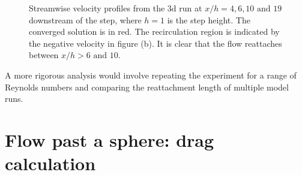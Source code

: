 \begin{figure}
\centering
{}
\caption{Streamwise velocity profiles from the 3d run at $x/h=4, 6, 10 \text{ and } 19$
downstream of the step, where $h=1$ is the step height. The converged solution is in red.
The recirculation region is indicated by the negative velocity in figure (b).
It is clear that the flow reattaches between $x/h>6 \text{ and } 10$.}
\label{Fig:UProfiles3d}
\end{figure}






A more rigorous analysis would involve
repeating the experiment for a range of Reynolds numbers and comparing the reattachment
length of multiple model runs.


\section{Flow past a sphere: drag calculation}
\label{sect:flow_past_sphere}
